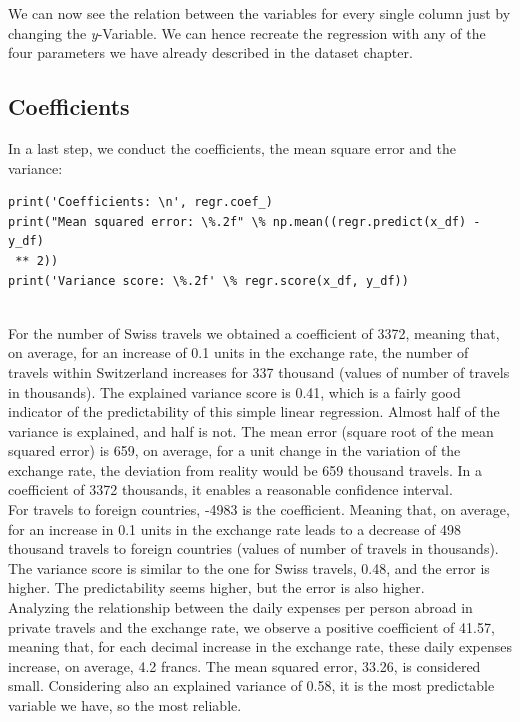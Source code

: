 \documentclass[12pt,a4paper,bibliography=totocnumbered,listof=totocnumbered]{scrartcl}
\begin{document}
We can now see the relation between the variables for every single column just by changing the \textit{y}-Variable. We can hence recreate the regression with any of the four parameters we have already described in the dataset chapter. 
\newpage
\subsection{Coefficients}
In a last step, we conduct the coefficients, the mean square error and the variance:
\ \\
\begin{verbatim}
print('Coefficients: \n', regr.coef_)
print("Mean squared error: \%.2f" \% np.mean((regr.predict(x_df) - y_df)
 ** 2))
print('Variance score: \%.2f' \% regr.score(x_df, y_df))
\end{verbatim}
\ \\
For the number of Swiss travels we obtained a coefficient of 3372, meaning that, on average, for an increase of 0.1 units in the exchange rate, the number of travels within Switzerland increases for 337 thousand (values of number of travels in thousands). The explained variance score is 0.41, which is a fairly good indicator of the predictability of this simple linear regression. Almost half of the variance is explained, and half is not. The mean error (square root of the mean squared error) is 659, on average, for a unit change in the variation of the exchange rate, the deviation from reality would be 659 thousand travels. In a coefficient of 3372 thousands, it enables a reasonable confidence interval. \\

For travels to foreign countries, -4983 is the coefficient. Meaning that, on average, for an increase in 0.1 units in the exchange rate leads to a decrease of 498 thousand travels to foreign countries (values of number of travels in thousands). The variance score is similar to the one for Swiss travels, 0.48, and the error is higher. The predictability seems higher, but the error is also higher. \\

Analyzing the relationship between the daily expenses per person abroad in private travels and the exchange rate, we observe a positive coefficient of 41.57, meaning that, for each decimal increase in the exchange rate, these daily expenses increase, on average, 4.2 francs. The mean squared error, 33.26, is considered small. Considering also an explained variance of 0.58, it is the most predictable variable we have, so the most reliable. \\
\end{document}
